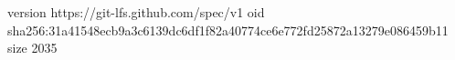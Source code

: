 version https://git-lfs.github.com/spec/v1
oid sha256:31a41548ecb9a3c6139dc6df1f82a40774ce6e772fd25872a13279e086459b11
size 2035
